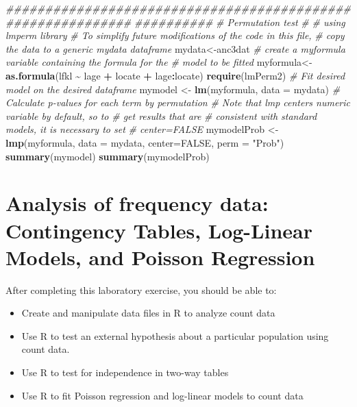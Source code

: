 \documentclass[
  12pt,
]{book}
\newenvironment{Shaded}{\begin{snugshade}}{\end{snugshade}}
\newcommand{\CommentTok}[1]{\textcolor[rgb]{0.56,0.35,0.01}{\textit{#1}}}
\newcommand{\DataTypeTok}[1]{\textcolor[rgb]{0.13,0.29,0.53}{#1}}
\newcommand{\KeywordTok}[1]{\textcolor[rgb]{0.13,0.29,0.53}{\textbf{#1}}}
\newcommand{\NormalTok}[1]{#1}
\newcommand{\OperatorTok}[1]{\textcolor[rgb]{0.81,0.36,0.00}{\textbf{#1}}}
\newcommand{\OtherTok}[1]{\textcolor[rgb]{0.56,0.35,0.01}{#1}}
\newcommand{\StringTok}[1]{\textcolor[rgb]{0.31,0.60,0.02}{#1}}
\providecommand{\tightlist}{%
  \setlength{\itemsep}{0pt}\setlength{\parskip}{0pt}}
\begin{document}
\begin{Shaded}
\begin{Highlighting}[]
\CommentTok{\#\#\#\#\#\#\#\#\#\#\#\#\#\#\#\#\#\#\#\#\#\#\#\#\#\#\#\#\#\#\#\#\#\#\#\#\#\#\#\#\#\#\#\#\#\#\#\#\#\#\#\#\#\#\#\#\#\#\#\#}
\CommentTok{\#\#\#\#\#\#\#\#\#\#}
\CommentTok{\# Permutation test}
\CommentTok{\#}
\CommentTok{\# using lmperm library}
\CommentTok{\# To simplify future modifications of the code in this file,}
\CommentTok{\# copy the data to a generic mydata dataframe}
\NormalTok{mydata\textless{}{-}anc3dat}
\CommentTok{\# create a myformula variable containing the formula for the}
\CommentTok{\# model to be fitted}
\NormalTok{myformula\textless{}{-}}\KeywordTok{as.formula}\NormalTok{(lfkl }\OperatorTok{\textasciitilde{}}\StringTok{ }\NormalTok{lage }\OperatorTok{+}\StringTok{ }\NormalTok{locate }\OperatorTok{+}\StringTok{ }\NormalTok{lage}\OperatorTok{:}\NormalTok{locate)}
\KeywordTok{require}\NormalTok{(lmPerm2)}
\CommentTok{\# Fit desired model on the desired dataframe}
\NormalTok{mymodel \textless{}{-}}\StringTok{ }\KeywordTok{lm}\NormalTok{(myformula, }\DataTypeTok{data =}\NormalTok{ mydata)}
\CommentTok{\# Calculate p{-}values for each term by permutation}
\CommentTok{\# Note that lmp centers numeric variable by default, so to}
\CommentTok{\# get results that are}
\CommentTok{\# consistent with standard models, it is necessary to set}
\CommentTok{\# center=FALSE}
\NormalTok{mymodelProb \textless{}{-}}\StringTok{ }\KeywordTok{lmp}\NormalTok{(myformula, }\DataTypeTok{data =}\NormalTok{ mydata, }\DataTypeTok{center=}\OtherTok{FALSE}\NormalTok{,}
\DataTypeTok{perm =} \StringTok{"Prob"}\NormalTok{)}
\KeywordTok{summary}\NormalTok{(mymodel)}
\KeywordTok{summary}\NormalTok{(mymodelProb)}
\end{Highlighting}
\end{Shaded}

\hypertarget{analysis-of-frequency-data-contingency-tables-log-linear-models-and-poisson-regression}{%
\chapter{Analysis of frequency data: Contingency Tables, Log-Linear Models, and Poisson Regression}\label{analysis-of-frequency-data-contingency-tables-log-linear-models-and-poisson-regression}}

After completing this laboratory exercise, you should be able to:

\begin{itemize}
\tightlist
\item
  Create and manipulate data files in R to analyze count data
\item
  Use R to test an external hypothesis about a particular population using count data.
\item
  Use R to test for independence in two-way tables
\item
  Use R to fit Poisson regression and log-linear models to count data
\end{itemize}
\end{document}
